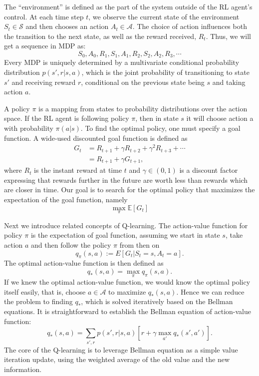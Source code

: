 \documentclass{article}
\begin{document}
The “environment” is defined as the part of the system outside of
the RL agent’s control. At each time step $t$, we observe the current
state of the environment $S_t \in \mathcal{S}$ and then chooses an action $A_t \in \mathcal{A}$. The choice of action influences both the transition to the next state, as well as the reward received, $R_t$. Thus, we will get a sequence in MDP as:
$$
S_0, A_0, R_1, S_1, A_1, R_2, S_2, A_2, R_3, \cdots
$$
Every MDP is uniquely determined by a multivariate conditional probability distribution $p(s', r|s, a)$, which is the joint probability of transitioning to state $s'$ and receiving reward $r$, conditional on the previous state being $s$ and taking action $a$.

A policy $\pi$ is a mapping from states to probability distributions over the action space. If the RL agent is following policy $\pi$, then in state $s$ it will choose action a with probability $\pi(a|s)$. To find the optimal policy, one must specify a goal function. A wide-used discounted goal function is defined as
\begin{equation}
    \begin{aligned}
        G_t &= R_{t+1} + \gamma R_{t+2} + \gamma^2 R_{t+3} + \cdots \\
            &= R_{t+1} + \gamma G_{t+1},
    \end{aligned}
\end{equation}
where $R_t$ is the instant reward at time $t$ and $\gamma \in (0, 1)$ is a discount factor expressing that rewards further in the future are worth less than rewards which are closer in time. Our goal is to search for the optimal policy that maximizes the expectation of the goal function, namely
$$
\max_\pi \mathbb{E}[G_t]
$$

Next we introduce related concepts of Q-learning. The action-value function for policy $\pi$ is the expectation of goal function, assuming we start in state $s$, take action $a$ and then follow the policy $\pi$ from then on
$$
q_\pi(s, a) := E[G_t|S_t = s, A_t = a].
$$
The optimal action-value function is then defined as
$$
q_*(s,a) = \max_\pi q_\pi(s, a).
$$
If we knew the optimal action-value function, we would know the optimal policy itself easily, that is, choose $a \in \mathcal{A}$ to maximize $q_*(s, a)$. 
Hence we can reduce the problem to finding $q_*$, which is solved iteratively based on the Bellman equations. It is straightforward to establish the Bellman equation of action-value function:
\begin{equation}
    q_*(s,a) =  \sum_{s', r} p(s',r|s,a)[r+\gamma \max_{a'} q_*(s',a')].
\end{equation}
The core of the Q-learning is to leverage Bellman equation as a simple value iteration update, using the weighted average of the old value and the new information.
\end{document}
